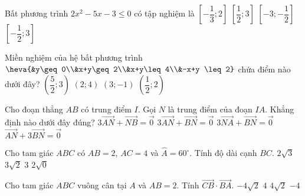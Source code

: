 \begin{ex}%
	Bất phương trình $2x^{2}-5x-3 \leq 0$ có tập nghiệm là
	\choice
	{$\left[-\dfrac{1}{3}; 2\right]$}
	{$\left[\dfrac{1}{2}; 3\right]$}
	{$\left[-3;-\dfrac{1}{2}\right]$}
	{\True $\left[-\dfrac{1}{2}; 3\right]$}
\end{ex}

\begin{ex}%
	Miền nghiệm của hệ bất phương trình $\heva{&y\geq 0\\&x+y\geq 2\\&x+y\leq 4\\&-x+y \leq 2}$ chứa điểm nào dưới đây?
	\choice
	{$\left(\dfrac{5}{2}; 3\right)$}
	{$(2; 4)$}
	{$(3;-1)$}
	{\True $\left(\dfrac{1}{2}; 2\right)$}
\end{ex}

\begin{ex}%
	Cho đoạn thẳng $AB$ có trung điểm $I$. Gọi $N$ là trung điểm của đoạn $IA$. Khẳng định nào dưới đây đúng?
	\choice
	{$3\overrightarrow{AN}+\overrightarrow{NB}=\overrightarrow{0}$}
	{\True $3\overrightarrow{AN}+\overrightarrow{BN}=\overrightarrow{0}$}
	{$3\overrightarrow{NA}+\overrightarrow{BN}=\overrightarrow{0}$}
	{$\overrightarrow{AN}+3 \overrightarrow{BN}=\overrightarrow{0}$}
\end{ex}

\begin{ex}%
	Cho tam giác $ABC$ có $AB=2$, $AC=4$ và $\widehat{A}=60^{\circ}$. Tính độ dài cạnh $BC$.
	\choice
	{\True $2\sqrt{3}$}
	{$3\sqrt{2}$}
	{$3$}
	{$2\sqrt{0}$}
\end{ex}

\begin{ex}%
	Cho tam giác $ABC$ vuông cân tại $A$ và $AB=2$. Tính $\overrightarrow{CB} \cdot \overrightarrow{BA}$.
	\choice
	{$-4\sqrt{2}$}
	{$4$}
	{$4\sqrt{2}$}
	{\True $-4$} 
\end{ex}

